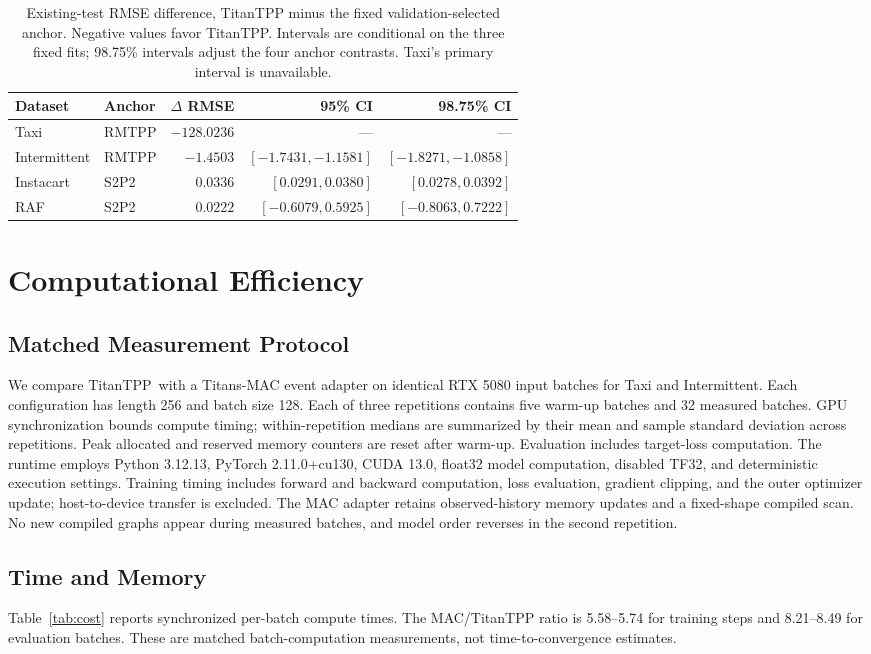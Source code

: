 \documentclass[runningheads]{llncs}
\newcommand{\method}{TitanTPP}
\begin{document}
\begin{table}[t]
\centering\small
\caption{Existing-test RMSE difference, TitanTPP minus the fixed
validation-selected anchor. Negative values favor TitanTPP. Intervals are
conditional on the three fixed fits; 98.75\% intervals adjust the four
anchor contrasts. Taxi's primary interval is unavailable.}
\label{tab:legacy-test-anchors}
\begin{tabular}{llrrr}
\toprule
Dataset & Anchor & $\Delta$ RMSE & 95\% CI & 98.75\% CI\\
\midrule
Taxi & RMTPP & $-128.0236$ & --- & ---\\
Intermittent & RMTPP & $-1.4503$ & $[-1.7431,-1.1581]$ & $[-1.8271,-1.0858]$\\
Instacart & S2P2 & $0.0336$ & $[0.0291,0.0380]$ & $[0.0278,0.0392]$\\
RAF & S2P2 & $0.0222$ & $[-0.6079,0.5925]$ & $[-0.8063,0.7222]$\\
\bottomrule
\end{tabular}
\end{table}

\section{Computational Efficiency}
\subsection{Matched Measurement Protocol}
We compare \method\ with a Titans-MAC event adapter on identical RTX 5080
input batches for Taxi and Intermittent. Each configuration has length 256
and batch size 128. Each of three repetitions contains five warm-up batches
and 32 measured batches. GPU synchronization bounds compute timing;
within-repetition medians are summarized by their mean and sample standard
deviation across repetitions. Peak allocated and reserved memory counters
are reset after warm-up. Evaluation includes target-loss computation. The
runtime employs Python 3.12.13, PyTorch 2.11.0+cu130, CUDA 13.0, float32
model computation, disabled TF32, and deterministic execution settings.
Training timing includes forward and backward computation, loss evaluation,
gradient clipping, and the outer optimizer update; host-to-device transfer
is excluded. The MAC adapter retains observed-history memory updates and
a fixed-shape compiled scan. No new compiled graphs appear during measured
batches, and model order reverses in the second repetition.

\subsection{Time and Memory}
Table~\ref{tab:cost} reports synchronized per-batch compute times. The
MAC/TitanTPP ratio is 5.58--5.74 for training steps and 8.21--8.49 for
evaluation batches. These are matched batch-computation measurements, not
time-to-convergence estimates.
\end{document}
